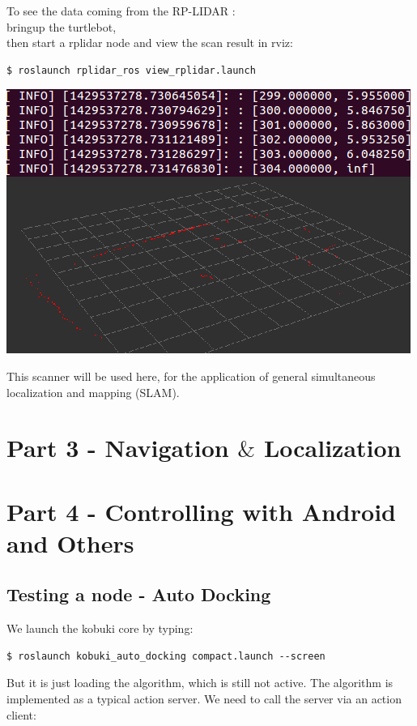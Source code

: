 \documentclass[10pt,a4paper]{article}
\begin{document}
To see the data coming from the RP-LIDAR :\\
bringup the turtlebot, \\
then start a rplidar node and view the scan result in rviz:
\begin{lstlisting}[frame=single] 
$ roslaunch rplidar_ros view_rplidar.launch
\end{lstlisting}

\begin{center}
\includegraphics[width=\textwidth]{images/infos+view.png}\\
\end{center}

This scanner will be used here, for the application of general simultaneous localization and mapping (SLAM).

\section{Part 3 - Navigation $\&$ Localization}

\section{Part 4 - Controlling with Android and Others}

\subsection{Testing a node - Auto Docking}
We launch the kobuki core by typing:

\begin{lstlisting}[frame=single] 
$ roslaunch kobuki_auto_docking compact.launch --screen
\end{lstlisting}
But it is just loading the algorithm, which is still not active. The algorithm is implemented as a typical action server. We need to call the server via an action client:
\end{document}
